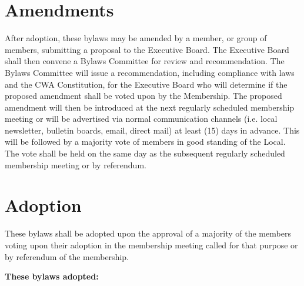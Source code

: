\documentclass[11pt]{article}
\newcommand{\article}[1]{\vspace{.50cm}\section{#1}}
\begin{document}
\article{Amendments}\label{amendments}
After adoption, these bylaws may be amended by a member, or group of members, submitting a proposal to the Executive Board. The Executive Board shall then convene a Bylaws Committee for review and recommendation. The Bylaws Committee will issue a recommendation, including compliance with laws and the CWA Constitution, for the Executive Board who will determine if the proposed amendment shall be voted upon by the Membership. The proposed amendment will then be introduced at the next regularly scheduled membership meeting or will be advertised via normal communication channels (i.e. local newsletter, bulletin boards, email, direct mail) at least (15) days in advance. This will be followed by a majority vote of members in good standing of the Local. The vote shall be held on the same day as the subsequent regularly scheduled membership meeting or by referendum.

\article{Adoption}
These bylaws shall be adopted upon the approval of a majority of the members voting upon their adoption in the membership meeting called for that purpose or by referendum of the membership.

\vspace{1cm}
\large{\textbf{These bylaws adopted:}} \date{September 26, 2022}
\end{document}
